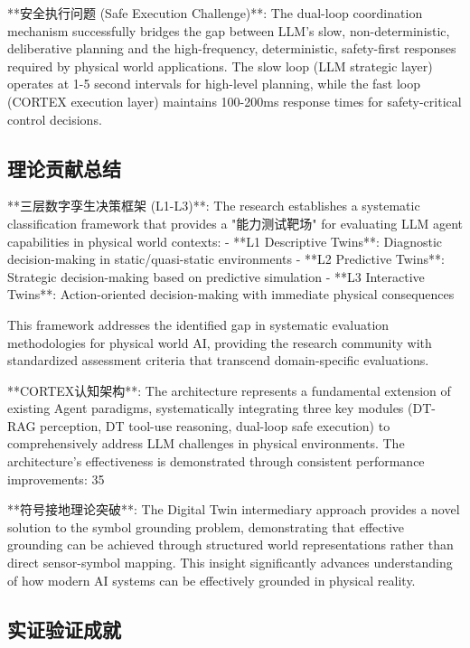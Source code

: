 **安全执行问题 (Safe Execution Challenge)**: The dual-loop coordination mechanism successfully bridges the gap between LLM's slow, non-deterministic, deliberative planning and the high-frequency, deterministic, safety-first responses required by physical world applications. The slow loop (LLM strategic layer) operates at 1-5 second intervals for high-level planning, while the fast loop (CORTEX execution layer) maintains 100-200ms response times for safety-critical control decisions.

\subsection{理论贡献总结}

**三层数字孪生决策框架 (L1-L3)**: The research establishes a systematic classification framework that provides a "能力测试靶场" for evaluating LLM agent capabilities in physical world contexts:
- **L1 Descriptive Twins**: Diagnostic decision-making in static/quasi-static environments
- **L2 Predictive Twins**: Strategic decision-making based on predictive simulation
- **L3 Interactive Twins**: Action-oriented decision-making with immediate physical consequences

This framework addresses the identified gap in systematic evaluation methodologies for physical world AI, providing the research community with standardized assessment criteria that transcend domain-specific evaluations.

**CORTEX认知架构**: The architecture represents a fundamental extension of existing Agent paradigms, systematically integrating three key modules (DT-RAG perception, DT tool-use reasoning, dual-loop safe execution) to comprehensively address LLM challenges in physical environments. The architecture's effectiveness is demonstrated through consistent performance improvements: 35%

**符号接地理论突破**: The Digital Twin intermediary approach provides a novel solution to the symbol grounding problem, demonstrating that effective grounding can be achieved through structured world representations rather than direct sensor-symbol mapping. This insight significantly advances understanding of how modern AI systems can be effectively grounded in physical reality.

\subsection{实证验证成就}

